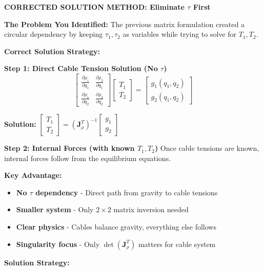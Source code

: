 \textbf{CORRECTED SOLUTION METHOD: Eliminate $\tau$ First}

\textbf{The Problem You Identified:} The previous matrix formulation created a circular dependency by keeping $\tau_1, \tau_2$ as variables while trying to solve for $T_1, T_2$.

\textbf{Correct Solution Strategy:}

\textbf{Step 1: Direct Cable Tension Solution (No $\tau$)}
\begin{equation}
\begin{bmatrix}
\frac{\partial \rho_1}{\partial q_1} & \frac{\partial \rho_2}{\partial q_1} \\
\frac{\partial \rho_1}{\partial q_2} & \frac{\partial \rho_2}{\partial q_2}
\end{bmatrix}
\begin{bmatrix} T_1 \\ T_2 \end{bmatrix} = 
\begin{bmatrix} g_1(q_1, q_2) \\ g_2(q_1, q_2) \end{bmatrix}
\end{equation}

\textbf{Solution:} $\begin{bmatrix} T_1 \\ T_2 \end{bmatrix} = (\mathbf{J}_{\rho}^T)^{-1} \begin{bmatrix} g_1 \\ g_2 \end{bmatrix}$

\textbf{Step 2: Internal Forces (with known $T_1, T_2$)}
Once cable tensions are known, internal forces follow from the equilibrium equations.

\textbf{Key Advantage:} 
\begin{itemize}
    \item \textbf{No $\tau$ dependency} - Direct path from gravity to cable tensions
    \item \textbf{Smaller system} - Only $2 \times 2$ matrix inversion needed
    \item \textbf{Clear physics} - Cables balance gravity, everything else follows
    \item \textbf{Singularity focus} - Only $\det(\mathbf{J}_{\rho}^T)$ matters for cable system
\end{itemize}

\textbf{Solution Strategy:}

